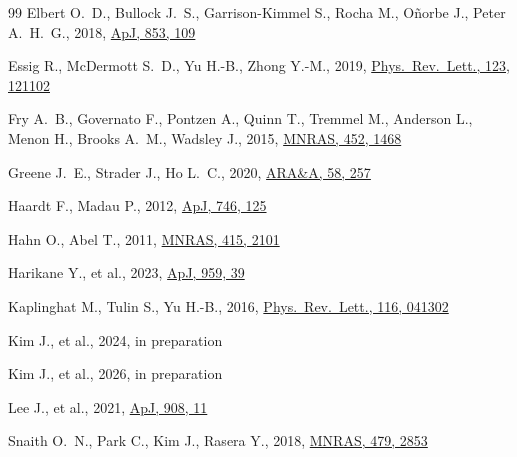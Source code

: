 \documentclass[fleqn,usenatbib]{mnras}
\begin{document}
\begin{thebibliography}{99}
Elbert O.~D., Bullock J.~S., Garrison-Kimmel S., Rocha M., O\~norbe J., Peter A.~H.~G., 2018, \href{https://doi.org/10.3847/1538-4357/aa9710}{ApJ, 853, 109}

Essig R., McDermott S.~D., Yu H.-B., Zhong Y.-M., 2019, \href{https://doi.org/10.1103/PhysRevLett.123.121102}{Phys.\ Rev.\ Lett., 123, 121102}

Fry A.~B., Governato F., Pontzen A., Quinn T., Tremmel M., Anderson L., Menon H., Brooks A.~M., Wadsley J., 2015, \href{https://doi.org/10.1093/mnras/stv1330}{MNRAS, 452, 1468}

Greene J.~E., Strader J., Ho L.~C., 2020, \href{https://doi.org/10.1146/annurev-astro-032620-021835}{ARA\&A, 58, 257}

Haardt F., Madau P., 2012, \href{https://doi.org/10.1088/0004-637X/746/2/125}{ApJ, 746, 125}

Hahn O., Abel T., 2011, \href{https://doi.org/10.1111/j.1365-2966.2011.18820.x}{MNRAS, 415, 2101}

Harikane Y., et al., 2023, \href{https://doi.org/10.3847/1538-4357/ad029e}{ApJ, 959, 39}

Kaplinghat M., Tulin S., Yu H.-B., 2016, \href{https://doi.org/10.1103/PhysRevLett.116.041302}{Phys.\ Rev.\ Lett., 116, 041302}

Kim J., et al., 2024, in preparation

Kim J., et al., 2026, in preparation

Lee J., et al., 2021, \href{https://doi.org/10.3847/1538-4357/abd08b}{ApJ, 908, 11}

Snaith O.~N., Park C., Kim J., Rasera Y., 2018, \href{https://doi.org/10.1093/mnras/sty1731}{MNRAS, 479, 2853}


\end{thebibliography}
\end{document}
